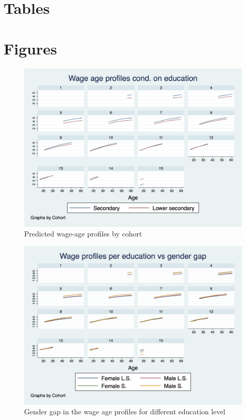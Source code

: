 \documentclass[12pt]{article}
\begin{document}
\section{Tables}
\begin{center}
    
    
    
    
    
    
    
    
    
    
    
\end{center}
\newpage

\section{Figures}

\begin{figure}
    \centering
    \includegraphics[scale=0.4]{graph1.png}
    \caption{\label{fig:pred_reg}Predicted wage-age profiles by cohort}
    
\end{figure}
\begin{figure}
    \centering
    \includegraphics[scale=0.4]{graph2.png}
    \caption{\label{fig:w_gend_l}Gender gap in the wage age profiles for different education level}
    
\end{figure}
\end{document}
